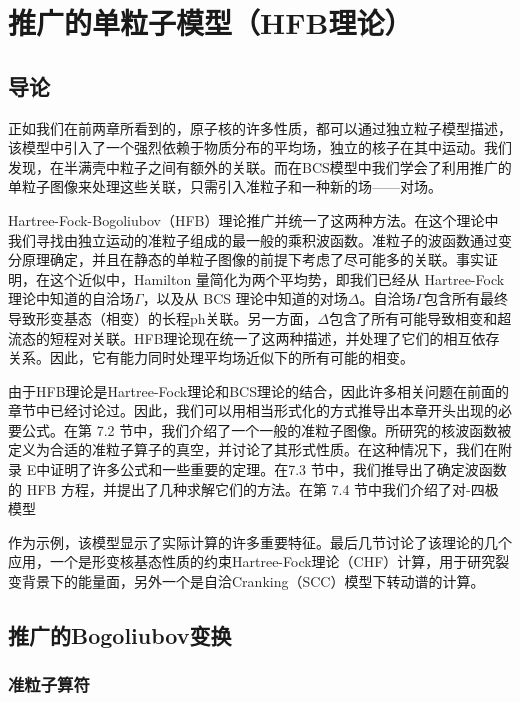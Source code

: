 
\chapter{推广的单粒子模型（HFB理论）\label{chap:=0063A8=005E7F=007684=005355=007C92=005B50=006A21=00578B=00FF08HFB=007406=008BBA=00FF09}}

\section{导论}

正如我们在前两章所看到的，原子核的许多性质，都可以通过独立粒子模型描述，该模型中引入了一个强烈依赖于物质分布的平均场，独立的核子在其中运动。我们发现，在半满壳中粒子之间有额外的关联。而在BCS模型中我们学会了利用推广的单粒子图像来处理这些关联，只需引入准粒子和一种新的场——对场。

Hartree-Fock-Bogoliubov（HFB）理论推广并统一了这两种方法。在这个理论中我们寻找由独立运动的准粒子组成的最一般的乘积波函数。准粒子的波函数通过变分原理确定，并且在静态的单粒子图像的前提下考虑了尽可能多的关联。事实证明，在这个近似中，Hamilton
量简化为两个平均势，即我们已经从 Hartree-Fock 理论中知道的自洽场$\Gamma$，以及从 BCS 理论中知道的对场$\Delta$。自洽场$\Gamma$包含所有最终导致形变基态（相变）的长程ph关联。另一方面，$\Delta$包含了所有可能导致相变和超流态的短程对关联。HFB理论现在统一了这两种描述，并处理了它们的相互依存关系。因此，它有能力同时处理平均场近似下的所有可能的相变。

由于HFB理论是Hartree-Fock理论和BCS理论的结合，因此许多相关问题在前面的章节中已经讨论过。因此，我们可以用相当形式化的方式推导出本章开头出现的必要公式。在第
7.2 节中，我们介绍了一个一般的准粒子图像。所研究的核波函数被定义为合适的准粒子算子的真空，并讨论了其形式性质。在这种情况下，我们在附录
E中证明了许多公式和一些重要的定理。在7.3 节中，我们推导出了确定波函数的 HFB 方程，并提出了几种求解它们的方法。在第 7.4
节中我们介绍了对-四极模型

作为示例，该模型显示了实际计算的许多重要特征。最后几节讨论了该理论的几个应用，一个是形变核基态性质的约束Hartree-Fock理论（CHF）计算，用于研究裂变背景下的能量面，另外一个是自洽Cranking（SCC）模型下转动谱的计算。

\section{推广的Bogoliubov变换}

\subsection{准粒子算符}

